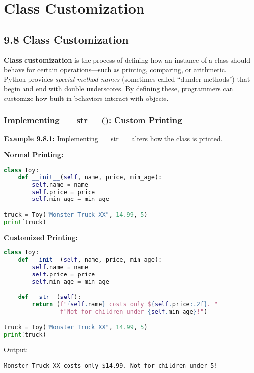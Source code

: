 \chapter{Class Customization}

\section*{9.8 Class Customization}

\textbf{Class customization} is the process of defining how an instance of a class should behave
for certain operations—such as printing, comparing, or arithmetic.  
Python provides \textit{special method names} (sometimes called “dunder methods”) that begin
and end with double underscores.  
By defining these, programmers can customize how built-in behaviors interact with objects.

\subsection*{Implementing \_\_str\_\_(): Custom Printing}

\noindent\textbf{Example 9.8.1:} Implementing \_\_str\_\_ alters how the class is printed.

\begin{multicols}{2}
\textbf{Normal Printing:}
\begin{lstlisting}[language=Python]
class Toy:
    def __init__(self, name, price, min_age):
        self.name = name
        self.price = price
        self.min_age = min_age

truck = Toy("Monster Truck XX", 14.99, 5)
print(truck)
\end{lstlisting}

\columnbreak
\textbf{Customized Printing:}
\begin{lstlisting}[language=Python]
class Toy:
    def __init__(self, name, price, min_age):
        self.name = name
        self.price = price
        self.min_age = min_age

    def __str__(self):
        return (f"{self.name} costs only ${self.price:.2f}. "
                f"Not for children under {self.min_age}!")

truck = Toy("Monster Truck XX", 14.99, 5)
print(truck)
\end{lstlisting}
\end{multicols}

\noindent Output:
\begin{verbatim}
Monster Truck XX costs only $14.99. Not for children under 5!
\end{verbatim}

